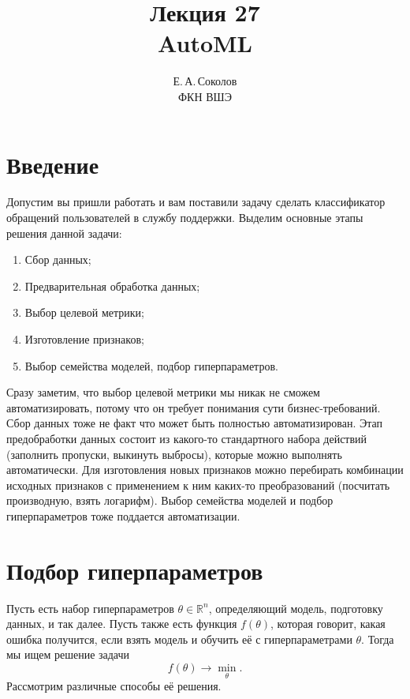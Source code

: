\documentclass[12pt, fleqn]{article}
\title{Лекция 27 \\ AutoML}
\author{Е.\,А.\,Соколов \\ ФКН ВШЭ}
\date{}
\begin{document}
\maketitle

\section{Введение}

Допустим вы пришли работать и вам поставили задачу сделать классификатор обращений пользователей в службу поддержки.
Выделим основные этапы решения данной задачи:

\begin{enumerate}
	\item Сбор данных;
	\item Предварительная обработка данных;
	\item Выбор целевой метрики;
	\item Изготовление признаков;
	\item Выбор семейства моделей, подбор гиперпараметров.
\end{enumerate}

Сразу заметим, что выбор целевой метрики мы никак не сможем автоматизировать, потому что он требует понимания сути бизнес-требований.
Сбор данных тоже не факт что может быть полностью автоматизирован.
Этап предобработки данных состоит из какого-то стандартного набора действий (заполнить пропуски, выкинуть выбросы), которые можно выполнять автоматически.
Для изготовления новых признаков можно перебирать комбинации исходных признаков с применением к ним каких-то преобразований (посчитать производную, взять логарифм).
Выбор семейства моделей и подбор гиперпараметров тоже поддается автоматизации.

\section{Подбор гиперпараметров}

Пусть есть набор гиперпараметров $\theta \in \mathbb{R}^{n}$, определяющий модель, подготовку данных, и так далее.
Пусть также есть функция $f(\theta)$, которая говорит, какая ошибка получится, если взять модель и обучить её с гиперпараметрами $\theta$.
Тогда мы ищем решение задачи
\[
	f(\theta) \to \min\limits_{\theta}.
\]
Рассмотрим различные способы её решения.
\end{document}

